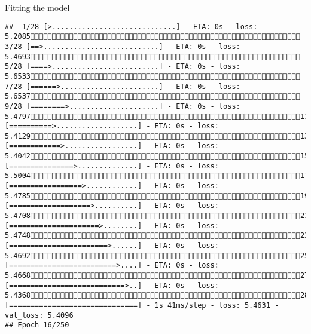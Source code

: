 \documentclass[
  ignorenonframetext,
]{beamer}
\begin{document}
\begin{frame}[fragile]{Fitting the model}
\begin{verbatim}
##  1/28 [>.............................] - ETA: 0s - loss: 5.2085 3/28 [==>...........................] - ETA: 0s - loss: 5.4693 5/28 [====>.........................] - ETA: 0s - loss: 5.6533 7/28 [======>.......................] - ETA: 0s - loss: 5.6537 9/28 [========>.....................] - ETA: 0s - loss: 5.479711/28 [==========>...................] - ETA: 0s - loss: 5.412913/28 [============>.................] - ETA: 0s - loss: 5.404215/28 [===============>..............] - ETA: 0s - loss: 5.500417/28 [=================>............] - ETA: 0s - loss: 5.478519/28 [===================>..........] - ETA: 0s - loss: 5.470821/28 [=====================>........] - ETA: 0s - loss: 5.474823/28 [=======================>......] - ETA: 0s - loss: 5.469225/28 [=========================>....] - ETA: 0s - loss: 5.466827/28 [===========================>..] - ETA: 0s - loss: 5.436828/28 [==============================] - 1s 41ms/step - loss: 5.4631 - val_loss: 5.4096
## Epoch 16/250

\end{verbatim}
\end{frame}
\end{document}
